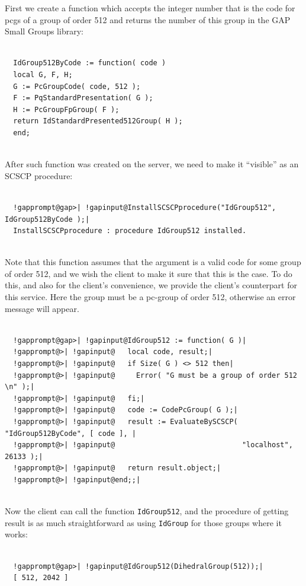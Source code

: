 \documentclass[a4paper,11pt]{report}
\begin{document}
{{ First we create a function which accepts the integer number that is the code
for pcgs of a group of order 512 and returns the number of this group in the
GAP Small Groups library: 
\begin{Verbatim}[commandchars=!@|,fontsize=\small,frame=single,label=Example]
  
  IdGroup512ByCode := function( code )
  local G, F, H;
  G := PcGroupCode( code, 512 );
  F := PqStandardPresentation( G );
  H := PcGroupFpGroup( F );
  return IdStandardPresented512Group( H );
  end;
  
\end{Verbatim}
 After such function was created on the server, we need to make it ``visible'' as an \textsf{SCSCP} procedure: 
\begin{Verbatim}[commandchars=!@|,fontsize=\small,frame=single,label=Example]
  
  !gapprompt@gap>| !gapinput@InstallSCSCPprocedure("IdGroup512", IdGroup512ByCode );|
  InstallSCSCPprocedure : procedure IdGroup512 installed. 
  
\end{Verbatim}
 Note that this function assumes that the argument is a valid code for some
group of order 512, and we wish the client to make it sure that this is the
case. To do this, and also for the client's convenience, we provide the
client's counterpart for this service. Here the group must be a pc-group of
order 512, otherwise an error message will appear. 
\begin{Verbatim}[commandchars=!@|,fontsize=\small,frame=single,label=Example]
  
  !gapprompt@gap>| !gapinput@IdGroup512 := function( G )|
  !gapprompt@>| !gapinput@   local code, result;|
  !gapprompt@>| !gapinput@   if Size( G ) <> 512 then|
  !gapprompt@>| !gapinput@     Error( "G must be a group of order 512 \n" );|
  !gapprompt@>| !gapinput@   fi;|
  !gapprompt@>| !gapinput@   code := CodePcGroup( G );|
  !gapprompt@>| !gapinput@   result := EvaluateBySCSCP( "IdGroup512ByCode", [ code ], |
  !gapprompt@>| !gapinput@                              "localhost", 26133 );|
  !gapprompt@>| !gapinput@   return result.object;|
  !gapprompt@>| !gapinput@end;;|
  
\end{Verbatim}
 Now the client can call the function \texttt{IdGroup512}, and the procedure of getting result is as much straightforward as using \texttt{IdGroup} for those groups where it works: 
\begin{Verbatim}[commandchars=!@|,fontsize=\small,frame=single,label=Example]
  
  !gapprompt@gap>| !gapinput@IdGroup512(DihedralGroup(512));|
  [ 512, 2042 ]
  
\end{Verbatim}
 }

 }
\end{document}
